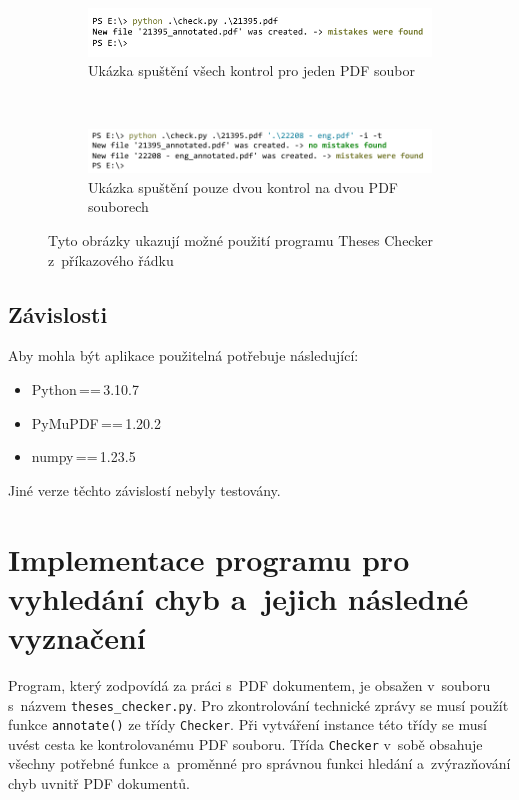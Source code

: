 \begin{figure}[H]
    \centering
    \begin{subfigure}[b]{0.8\linewidth}
        \includegraphics[width=\linewidth]{obrazky-figures/cmd_screenshot_one.pdf}
        \caption{Ukázka spuštění všech kontrol pro jeden PDF soubor}
        \label{pic_theses_checker_cmd_one}
    \end{subfigure}

    \hfill\\
    \begin{subfigure}[b]{0.85\linewidth}
        \includegraphics[width=\linewidth]{obrazky-figures/cmd_screenshot_many.pdf}
        \caption{Ukázka spuštění pouze dvou kontrol na dvou PDF souborech}
        \label{pic_theses_checker_cmd_many}
    \end{subfigure}
    \caption{
        Tyto obrázky ukazují možné použití programu Theses Checker
        z~příkazového řádku
    }
    \label{pic_theses_checker_cmd}
\end{figure}



\subsection*{Závislosti}
Aby mohla být aplikace použitelná potřebuje následující:
\begin{itemize}
    \item Python\,==\,3.10.7
    \item PyMuPDF\,==\,1.20.2
    \item numpy\,==\,1.23.5
\end{itemize}
Jiné verze těchto závislostí nebyly testovány.



\section{Implementace programu pro vyhledání chyb a~jejich následné vyznačení} \label{checker}
Program, který zodpovídá za práci s~PDF dokumentem, je obsažen v~souboru s~názvem
\texttt{theses\_checker.py}. Pro zkontrolování technické zprávy se musí použít
funkce \texttt{annotate()} ze třídy \texttt{Checker}. Při vytváření instance této
třídy se musí uvést cesta ke kontrolovanému PDF souboru. Třída \texttt{Checker}
v~sobě obsahuje všechny potřebné funkce a~proměnné pro správnou funkci hledání
a~zvýrazňování chyb uvnitř PDF dokumentů.

